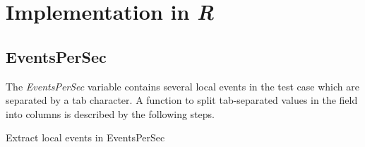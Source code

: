 
\lhead[\chaptername~\thechapter]{\rightmark}

\rhead[\leftmark]{}

\lfoot[\thepage]{}

\cfoot{}

\rfoot[]{\thepage}

\chapter{Implementation in \emph{R}\label{chap:Implementation}}

\section{EventsPerSec\label{sec:EventsPerSec}}

The \emph{EventsPerSec} variable contains several local events in
the test case which are separated by a tab character. A function to
split tab-separated values in the field into columns is described
by the following steps.

\begin{algorithm}[h]
\caption{Extract local events in EventsPerSec}

\begin{algorithmic}[1] 
\Else{}
\EndIf
\EndFor
\EndFor
{}
\end{algorithmic}
\end{algorithm}


